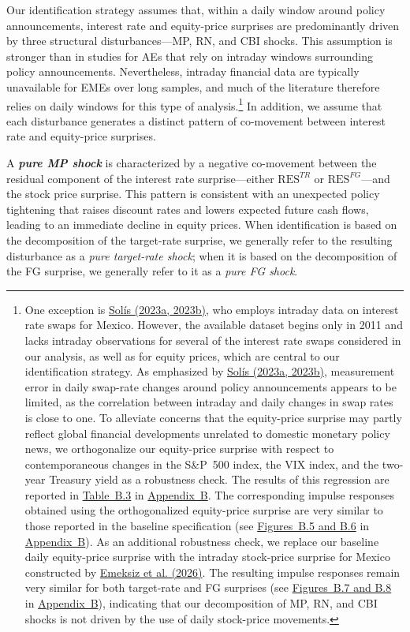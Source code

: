 \documentclass[\latexroot/\projectname]{subfiles}
\begin{document}
Our identification strategy assumes that, within a daily window around policy announcements, interest rate and equity-price surprises are predominantly driven by three structural disturbances—MP, RN, and CBI shocks. This assumption is stronger than in studies for AEs that rely on intraday windows surrounding policy announcements. Nevertheless, intraday financial data are typically unavailable for EMEs over long samples, and much of the literature therefore relies on daily windows for this type of analysis.\footnote{One exception is \hyperlink{Solis (2023a)}{Solís (2023a, 2023b)}, who employs intraday data on interest rate swaps for Mexico. However, the available dataset begins only in 2011 and lacks intraday observations for several of the interest rate swaps considered in our analysis, as well as for equity prices, which are central to our identification strategy. As emphasized by \hyperlink{Solis (2023a)}{Solís (2023a, 2023b)}, measurement error in daily swap-rate changes around policy announcements appears to be limited, as the correlation between intraday and daily changes in swap rates is close to one. To alleviate concerns that the equity-price surprise may partly reflect global financial developments unrelated to domestic monetary policy news, we orthogonalize our equity-price surprise with respect to contemporaneous changes in the S\&P~500 index, the VIX index, and the two-year Treasury yield as a robustness check. The results of this regression are reported in \hyperlink{Table B.3}{Table~B.3} in \hyperlink{Appendix B}{Appendix~B}. The corresponding impulse responses obtained using the orthogonalized equity-price surprise are very similar to those reported in the baseline specification (see \hyperlink{Figure B.5}{Figures~B.5 and B.6} in \hyperlink{Appendix B}{Appendix~B}). As an additional robustness check, we replace our baseline daily equity-price surprise with the intraday stock-price surprise for Mexico constructed by \hyperlink{Emeksiz et al. (2026)}{Emeksiz et al. (2026)}. The resulting impulse responses remain very similar for both target-rate and FG surprises (see \hyperlink{Figure B.7}{Figures~B.7 and B.8} in \hyperlink{Appendix B}{Appendix~B}), indicating that our decomposition of MP, RN, and CBI shocks is not driven by the use of daily stock-price movements.}
In addition, we assume that each disturbance generates a distinct pattern of co-movement between interest rate and equity-price surprises.



A \emph{\textbf{pure MP shock}} is characterized by a negative co-movement between the residual component of the interest rate surprise—either $\text{RES}^{TR}$ or $\text{RES}^{FG}$—and the stock price surprise. This pattern is consistent with an unexpected policy tightening that raises discount rates and lowers expected future cash flows, leading to an immediate decline in equity prices. When identification is based on the decomposition of the target-rate surprise, we generally refer to the resulting disturbance as a \emph{pure target-rate shock}; when it is based on the decomposition of the FG surprise, we generally refer to it as a \emph{pure FG shock}.
\end{document}
